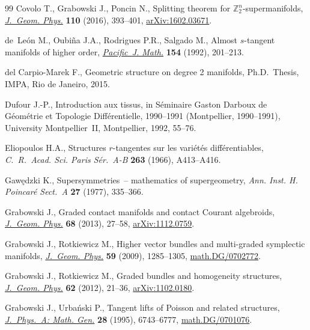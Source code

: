 \begin{thebibliography}{99}
Covolo T., Grabowski J., Poncin N., Splitting theorem for
  $\mathbb{Z}_{2}^{n}$-supermanifolds, \href{http://dx.doi.org/10.1016/j.geomphys.2016.09.006}{\textit{J.~Geom. Phys.}} \textbf{110}
  (2016), 393--401, \href{http://arxiv.org/abs/1602.03671}{arXiv:1602.03671}.

de~Le{\'o}n M., Oubi{\~n}a J.A., Rodrigues P.R., Salgado M., Almost
  {$s$}-tangent manifolds of higher order, \href{http://projecteuclid.org/euclid.pjm/1102635616}{\textit{Pacific~J. Math.}}
  \textbf{154} (1992), 201--213.

del Carpio-Marek F., Geometric structure on degree 2 manifolds, Ph.D.~Thesis,
  IMPA, Rio de Janeiro, 2015.

Dufour J.-P., Introduction aux tissus, in S\'eminaire {G}aston {D}arboux de
  {G}\'eom\'etrie et {T}opologie {D}if\/f\'erentielle, 1990--1991 ({M}ontpellier,
  1990--1991), University Montpellier~II, Montpellier, 1992, 55--76.

Eliopoulos H.A., Structures {$r$}-tangentes sur les vari\'et\'es
  dif\/f\'erentiables, \textit{C.~R.~Acad. Sci. Paris S\'er.~A-B} \textbf{263}
  (1966), A413--A416.

Gaw\k{e}dzki K., Supersymmetries~-- mathematics of supergeometry, \textit{Ann.
  Inst. H. Poincar\'e Sect.~A} \textbf{27} (1977), 335--366.

Grabowski J., Graded contact manifolds and contact {C}ourant algebroids,
  \href{http://dx.doi.org/10.1016/j.geomphys.2013.02.001}{\textit{J.~Geom. Phys.}} \textbf{68} (2013), 27--58, \href{http://arxiv.org/abs/1112.0759}{arXiv:1112.0759}.

Grabowski J., Rotkiewicz M., Higher vector bundles and multi-graded symplectic
  manifolds, \href{http://dx.doi.org/10.1016/j.geomphys.2009.06.009}{\textit{J.~Geom. Phys.}} \textbf{59} (2009), 1285--1305,
  \href{http://arxiv.org/abs/math.DG/0702772}{math.DG/0702772}.

Grabowski J., Rotkiewicz M., Graded bundles and homogeneity structures,
  \href{http://dx.doi.org/10.1016/j.geomphys.2011.09.004}{\textit{J.~Geom. Phys.}} \textbf{62} (2012), 21--36, \href{http://arxiv.org/abs/1102.0180}{arXiv:1102.0180}.

Grabowski J., Urba{\'n}ski P., Tangent lifts of {P}oisson and related
  structures, \href{http://dx.doi.org/10.1088/0305-4470/28/23/024}{\textit{J.~Phys.~A: Math. Gen.}} \textbf{28} (1995), 6743--6777,
  \href{http://arxiv.org/abs/math.DG/0701076}{math.DG/0701076}.


\end{thebibliography}
